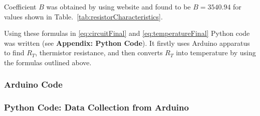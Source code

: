 \documentclass[../main.tex]{subfiles}
\begin{document}
Coefficient $B$ was obtained by using website \textcite{betaCalculation} and found to be $B = 3540.94$ for values shown in Table.~\ref{tab:resistorCharacteristics}. \par 

Using these formulas in \eqref{eq:circuitFinal} and \eqref{eq:temperatureFinal} Python code was written (see \textbf{Appendix: Python Code}). It firstly uses Arduino apparatus to find $R_T$, thermistor resistance, and then converts $R_T$ into temperature by using the formulas outlined above. \par 

\newpage \thispagestyle{plain}
\subsubsection*{Arduino Code} \label{subsubsec:arduinoCode} 
\lstset{breaklines=true}


\newpage \thispagestyle{plain}
\subsubsection*{Python Code: Data Collection from Arduino} \label{subsubsec:pythonCode}
\lstset{breaklines=true}

\end{document}
